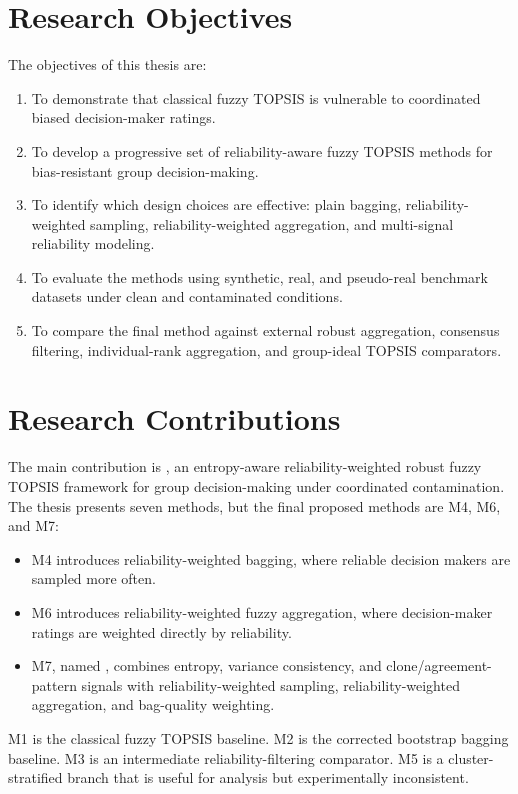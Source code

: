 \section{Research Objectives}
The objectives of this thesis are:

\begin{enumerate}
    \item To demonstrate that classical fuzzy TOPSIS is vulnerable to coordinated biased decision-maker ratings.
    \item To develop a progressive set of reliability-aware fuzzy TOPSIS methods for bias-resistant group decision-making.
    \item To identify which design choices are effective: plain bagging, reliability-weighted sampling, reliability-weighted aggregation, and multi-signal reliability modeling.
    \item To evaluate the methods using synthetic, real, and pseudo-real benchmark datasets under clean and contaminated conditions.
    \item To compare the final method against external robust aggregation, consensus filtering, individual-rank aggregation, and group-ideal TOPSIS comparators.
\end{enumerate}

\section{Research Contributions}
The main contribution is \methodname{}, an entropy-aware reliability-weighted robust fuzzy TOPSIS framework for group decision-making under coordinated contamination. The thesis presents seven methods, but the final proposed methods are M4, M6, and M7:

\begin{itemize}
    \item M4 introduces reliability-weighted bagging, where reliable decision makers are sampled more often.
    \item M6 introduces reliability-weighted fuzzy aggregation, where decision-maker ratings are weighted directly by reliability.
    \item M7, named \methodname{}, combines entropy, variance consistency, and clone/agreement-pattern signals with reliability-weighted sampling, reliability-weighted aggregation, and bag-quality weighting.
\end{itemize}

M1 is the classical fuzzy TOPSIS baseline. M2 is the corrected bootstrap bagging baseline. M3 is an intermediate reliability-filtering comparator. M5 is a cluster-stratified branch that is useful for analysis but experimentally inconsistent.

